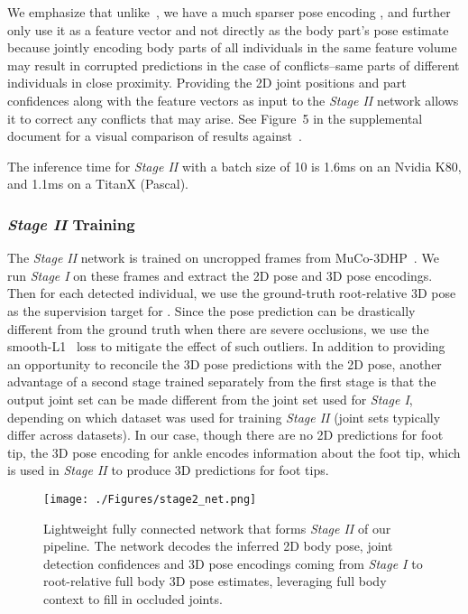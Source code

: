 \documentclass[acmtog,authorversion]{acmart}
\begin{document}
We emphasize that unlike~\citet{mehta_3dv18}, we have a much sparser pose encoding , and further only use it as a feature vector and not directly as the body part's pose estimate because jointly encoding body parts of all individuals in the same feature volume 
may result in corrupted predictions in the case of conflicts--same parts of different individuals in close proximity.
Providing the 2D joint positions and part confidences along with the feature vectors as input to the \textit{Stage II} network allows it to correct any conflicts that may arise. See Figure~5 in the supplemental document for a visual comparison of results against~\cite{mehta_3dv18}. 

 The inference time for \textit{Stage II} with a batch size of 10 is 1.6ms on an Nvidia K80, and 1.1ms on a TitanX (Pascal).

\subsubsection{\textit{Stage II} Training}
The \textit{Stage II} network is trained on uncropped frames from MuCo-3DHP~\cite{mehta_3dv18}. 
We run \textit{Stage I} on these frames and extract the 2D pose and 3D pose encodings. Then for each detected individual, we use the 
ground-truth root-relative 3D pose as the supervision target for . 
Since the pose prediction can be drastically different from the ground truth when there are severe occlusions, we use the smooth-L1~\cite{ren_faster_rcnn_nips15} loss to mitigate the effect of such outliers.
In addition to providing an opportunity to reconcile the 3D pose predictions with the 2D pose, another advantage of a second stage trained separately from the first stage is that the output joint set can be made different from the joint set used for \textit{Stage I}, depending on which dataset was used for training \textit{Stage II} (joint sets typically differ across datasets).  
In our case, though there are no 2D predictions for foot tip, the 3D pose encoding for ankle encodes information about the foot tip, which is used in \textit{Stage II} to produce 3D predictions for foot tips.


\begin{figure}[t]
  \texttt{[image: ./Figures/stage2\_net.png]}
  \caption
  {Lightweight fully connected network that forms \textit{Stage II} of our pipeline. The network decodes the inferred 2D body pose, joint detection confidences and 3D pose encodings coming from \textit{Stage I} to root-relative full body 3D pose  estimates, leveraging full body context to fill in occluded joints.}
  \label{fig:stage2}
\end{figure}
\end{document}

